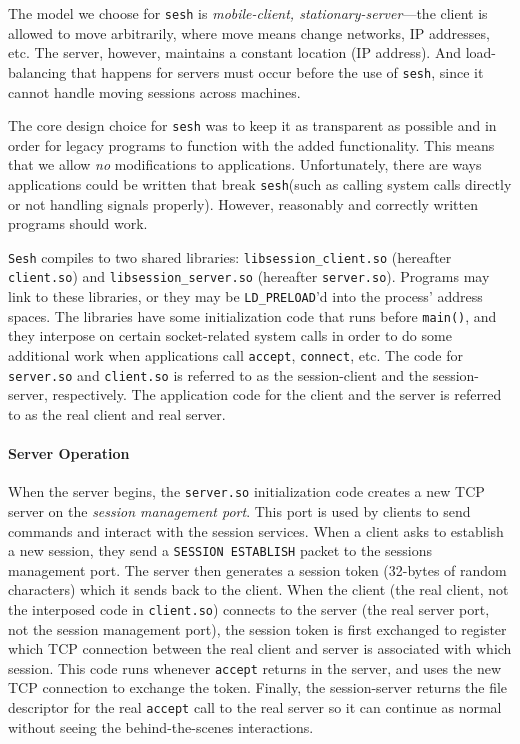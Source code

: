 \documentclass[twocolumn,11pt]{article}
\newcommand{\sesh}{\texttt{sesh}\xspace}
\newcommand{\Sesh}{\texttt{Sesh}\xspace}
\begin{document}
The model we choose for \sesh is \textit{mobile-client, stationary-server}---the
client is allowed to move arbitrarily, where move means change networks, IP
addresses, etc. The server, however, maintains a constant location (IP address).
And load-balancing that happens for servers must occur before the use of \sesh,
since it cannot handle moving sessions across machines.

The core design choice for \sesh was to keep it as transparent as possible and
in order for legacy programs to function with the added functionality. This
means that we allow \textit{no} modifications to applications. Unfortunately,
there are ways applications could be written that break \sesh (such as calling
system calls directly or not handling signals properly). However, reasonably and
correctly written programs should work.

\newcommand{\clientso}{\texttt{client.so}\xspace}
\newcommand{\serverso}{\texttt{server.so}\xspace}

\Sesh compiles to two shared libraries: \texttt{libsession\_client.so}
(hereafter \clientso) and \texttt{libsession\_server.so} (hereafter \serverso).
Programs may link to these libraries, or they may be \texttt{LD\_PRELOAD}'d into
the process' address spaces. The libraries have some initialization code that
runs before \texttt{main()}, and they interpose on certain socket-related system
calls in order to do some additional work when applications call
\texttt{accept}, \texttt{connect}, etc. The code for \serverso and \clientso is
referred to as the session-client and the session-server, respectively. The
application code for the client and the server is referred to as the real client
and real server.

\paragraph{Server Operation}
When the server begins, the \serverso initialization code creates a new TCP
server on the \textit{session management port}. This port is used by clients to
send commands and interact with the session services.
When a client asks to
establish a new session, they send a \texttt{SESSION ESTABLISH} packet to the
sessions management port. The server then generates a session token (32-bytes of
random characters) which it sends back to the client. When the client (the real
client, not the interposed code in \clientso) connects to the server (the real
server port, not the session management port), the session token is first
exchanged to register which TCP connection between the real client and server is
associated with which session. This code runs whenever \texttt{accept} returns
in the server, and uses the new TCP connection to exchange the token. Finally,
the session-server returns the file descriptor for the real \texttt{accept} call to the
real server so it can continue as normal without seeing the behind-the-scenes
interactions.
\end{document}
